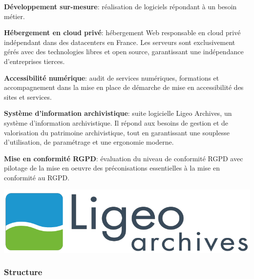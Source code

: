 \documentclass[12pt]{article}
\begin{document}
\noindent%
\begin{minipage}{.7\textwidth}%

\textbf{Développement sur-mesure}: réalisation de logiciels répondant à un besoin métier.

\textbf{Hébergement en cloud privé}: hébergement Web responsable en \gls{cloud privé} indépendant dans des datacenters en France. 
Les serveurs sont exclusivement gérés avec des technologies libres et open source, garantissant une indépendance d'entreprises tierces.

\textbf{Accessibilité numérique}: audit de services numériques, formations et accompagnement dans la mise en place de démarche de mise en accessibilité des sites et services.

\textbf{Système d'information archivistique}: suite logicielle Ligeo Archives, un système d'information archivistique. 
Il répond aux besoins de gestion et de valorisation du patrimoine archivistique, tout en garantissant une souplesse d'utilisation, de paramétrage et une ergonomie moderne.

\textbf{Mise en conformité \gls{RGPD}}: évaluation du niveau de conformité \gls{RGPD} avec pilotage de la mise en oeuvre des préconisations essentielles à la mise en conformité au \gls{RGPD}.

\end{minipage}%
\hfill
\begin{minipage}{.3\textwidth}%
\begin{center}
    \includegraphics[scale=0.22]{src/logo_ligeo.png}
\end{center}
\end{minipage}%


\subsubsection{Structure}
\end{document}
